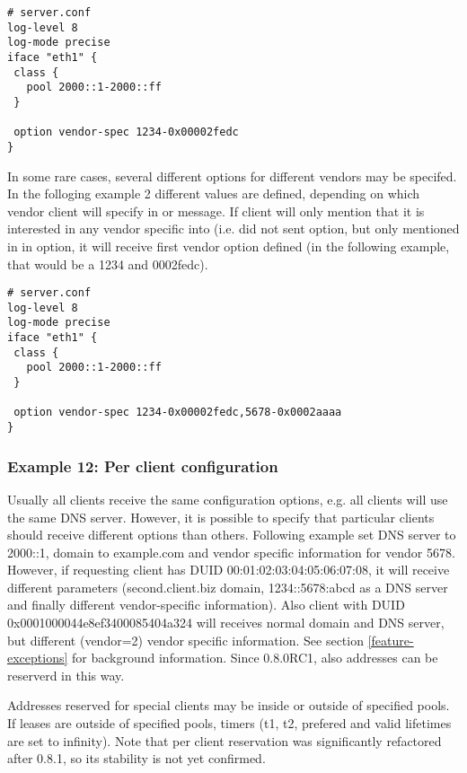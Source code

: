 \begin{lstlisting}
# server.conf
log-level 8
log-mode precise
iface "eth1" {
 class {
   pool 2000::1-2000::ff
 }

 option vendor-spec 1234-0x00002fedc
}
\end{lstlisting}

In some rare cases, several different options for different vendors
may be specifed. In the folloging example 2 different values are
defined, depending on which vendor client will specify in  or
 message. If client will only mention that it is interested in
any vendor specific into (i.e. did not sent  option, but
only mentioned in in  option, it will receive
first vendor option defined (in the following example, that would be a
1234 and 0002fedc).

\begin{lstlisting}
# server.conf
log-level 8
log-mode precise
iface "eth1" {
 class {
   pool 2000::1-2000::ff
 }

 option vendor-spec 1234-0x00002fedc,5678-0x0002aaaa
}
\end{lstlisting}

\subsubsection{Example 12: Per client configuration}
\label{example-server-exceptions}
Usually all clients receive the same configuration options, e.g. all
clients will use the same DNS server. However, it is possible to
specify that particular clients should receive different options than
others. Following example set DNS server to 2000::1, domain
to example.com and vendor specific information for vendor 5678.
However, if requesting client has DUID 00:01:02:03:04:05:06:07:08, it
will receive different parameters (second.client.biz domain,
1234::5678:abcd as a DNS server and finally different vendor-specific
information). Also client with DUID 0x0001000044e8ef3400085404a324
will receives normal domain and DNS server, but different (vendor=2)
vendor specific information. See section \ref{feature-exceptions} for
background information. Since 0.8.0RC1, also addresses can be reserverd
in this way.

Addresses reserved for special clients may be inside or outside of specified
pools. If leases are outside of specified pools, timers (t1, t2,
prefered and valid lifetimes are set to infinity). Note that per
client reservation was significantly refactored after 0.8.1, so its
stability is not yet confirmed.

